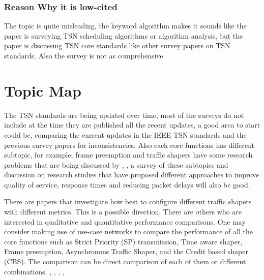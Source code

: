 \documentclass{article}
\begin{document}
\subsubsection{Reason Why it is low-cited}
The topic is quite misleading, the keyword algorithm makes it sounds like the paper is surveying  TSN scheduling algorithms or algorithm analysis, but the paper is  discussing TSN core standards like other survey papers on TSN standards. Also the survey is not as comprehensive.
\section{Topic Map}
The TSN standards are being updated over time, most of the surveys do not include at the time they are published all the recent updates, a good area to start could be, comparing the current updates in the IEEE TSN standards and the previous survey papers for inconsistencies. Also each core functions has different subtopic, for example, frame preemption and traffic shapers have some research problems that are being discussed by  \cite{ojewale2021worst}, \cite{turcanu2021poster} , a survey of these subtopics and discussion on research studies that have proposed different approaches to improve quality of service, response times and reducing packet delays will also be good.

There are papers that investigate how best to configure different traffic shapers with different metrics. This is a possible direction. There are others who are interested in qualitative and quantitative performance comparisons. One may consider making use of use-case networks to compare the performance of all the core functions such as  Strict Priority (SP) transmission, Time aware shaper, Frame preemption, Asynchronous Traffic Shaper, and the Credit based shaper (CBS). The comparison can be direct comparison of each of them or different combinations.
\cite{thiele2016formal}, \cite{hellmanns2020performance}, \cite{shi2021evaluating}, \cite{xie2020comparison}, \cite{bello2018recent}


\end{document}
